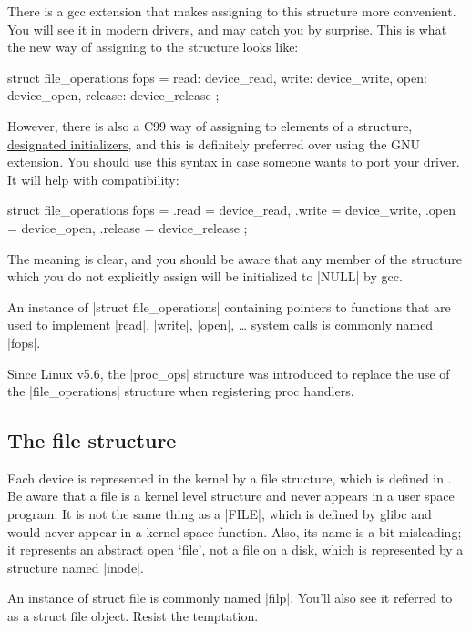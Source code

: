 \documentclass[10pt, oneside]{book}
\begin{document}
There is a gcc extension that makes assigning to this structure more convenient.
You will see it in modern drivers, and may catch you by surprise.
This is what the new way of assigning to the structure looks like:

\begin{code}
struct file_operations fops = {
	read: device_read,
	write: device_write,
	open: device_open,
	release: device_release
};
\end{code}

However, there is also a C99 way of assigning to elements of a structure, \href{https://gcc.gnu.org/onlinedocs/gcc/Designated-Inits.html}{designated initializers}, and this is definitely preferred over using the GNU extension.
You should use this syntax in case someone wants to port your driver.
It will help with compatibility:

\begin{code}
struct file_operations fops = {
	.read = device_read,
	.write = device_write,
	.open = device_open,
	.release = device_release
};
\end{code}

The meaning is clear, and you should be aware that any member of the structure which you do not explicitly assign will be initialized to \cpp|NULL| by gcc.

An instance of \cpp|struct file_operations| containing pointers to functions that are used to implement \cpp|read|, \cpp|write|, \cpp|open|, \ldots{} system calls is commonly named \cpp|fops|.

Since Linux v5.6, the \cpp|proc_ops| structure was introduced to replace the use of the \cpp|file_operations| structure when registering proc handlers.

\subsection{The file structure}
\label{sec:file_struct}

Each device is represented in the kernel by a file structure, which is defined in .
Be aware that a file is a kernel level structure and never appears in a user space program.
It is not the same thing as a \cpp|FILE|, which is defined by glibc and would never appear in a kernel space function.
Also, its name is a bit misleading; it represents an abstract open `file', not a file on a disk, which is represented by a structure named \cpp|inode|.

An instance of struct file is commonly named \cpp|filp|.
You'll also see it referred to as a struct file object.
Resist the temptation.
\end{document}

